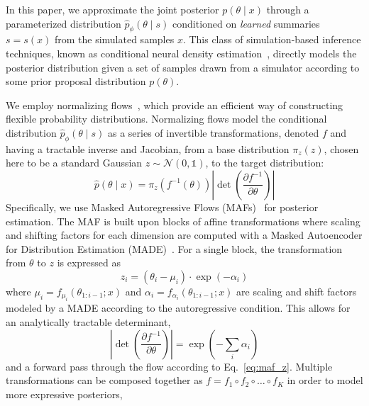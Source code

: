 \documentclass[prd,aps,10pt,nofootinbib,twocolumn,superscriptaddress,preprintnumbers,balancelastpage,longbibliography]{revtex4-1}
\begin{document}
In this paper, we approximate the joint posterior $p(\theta\mid x)$ through a parameterized distribution $\hat p_\phi(\theta\mid s)$ conditioned on \emph{learned} summaries $s=s(x)$ from the simulated samples $x$. This class of simulation-based inference techniques, known as conditional neural density estimation~\cite{papamakariosFastEpsilonFree2018}, directly models the posterior distribution given a set of samples drawn from a simulator according to some prior proposal distribution $p(\theta)$.

We employ normalizing flows~\cite{papamakarios2019normalizing,rezende2015variational}, which provide an efficient way of constructing flexible probability distributions. Normalizing flows model the conditional distribution $\hat p_\phi(\theta\mid s)$ as a series of invertible transformations, denoted $f$ and having a tractable inverse and Jacobian, from a base distribution $\pi_z({z})$, chosen here to be a standard Gaussian $z\sim \mathcal N(0, \mathbb{1})$, to the target distribution:
\begin{equation}
    \hat{p}({\theta} \mid {x})=\pi_{z}\left(f^{-1}({\theta})\right)\left|\operatorname{det}\left(\frac{\partial f^{-1}}{\partial {\theta}}\right)\right|
\end{equation}
Specifically, we use Masked Autoregressive Flows (MAFs)~\cite{10.5555/3294771.3294994} for posterior estimation. The MAF is built upon blocks of affine transformations where scaling and shifting factors for each dimension are computed with a Masked Autoencoder for Distribution Estimation (MADE)~\cite{germain2015made}. For a single block, the transformation from $\theta$ to $z$ is expressed as 
\begin{equation}
    \label{eq:maf_z}
    z_{i}=\left(\theta_{i}-\mu_{i}\right) \cdot \exp \left(-\alpha_{i}\right)
\end{equation}
where $\mu_{i}=f_{\mu_{i}}\left({\theta}_{1: i-1} ; {x}\right)$ and $\alpha_i = f_{\alpha_{i}}\left({\theta}_{1: i-1} ; {x}\right)$ are scaling and shift factors modeled by a MADE according to the autoregressive condition. This allows for an analytically tractable determinant,
\begin{equation}
    \label{eq:det}
    \left|\operatorname{det}\left(\frac{\partial f^{-1}}{\partial {\theta}}\right)\right|=\exp \left(-\sum_{i} \alpha_{i}\right)
\end{equation}
and a forward pass through the flow according to Eq.~\eqref{eq:maf_z}.
Multiple transformations can be composed together as $f=f_{1} \circ f_{2} \circ \ldots \circ f_{K}$ in order to model more expressive posteriors,
\end{document}
